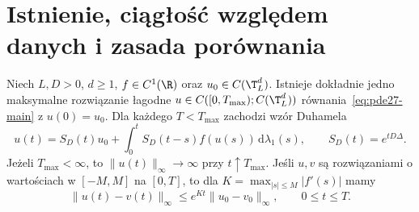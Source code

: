 \section{Istnienie, ciągłość względem danych i zasada porównania}
\begin{twierdzenie}\label{thm:pde27-local}
Niech $L,D>0$, $d\ge1$, $f\in C^1(\R)$ oraz
$u_0\in C(\T_L^d)$. Istnieje dokładnie jedno maksymalne
rozwiązanie łagodne $u\in C([0,T_{\max});C(\T_L^d))$
równania~\eqref{eq:pde27-main} z $u(0)=u_0$.
Dla każdego $T<T_{\max}$ zachodzi wzór Duhamela
\[
 u(t)=S_D(t)u_0+\int_0^tS_D(t-s)f(u(s))\,\mathrm d\lambda_1(s),
 \qquad S_D(t)=e^{tD\Delta}.
\]
Jeżeli $T_{\max}<\infty$, to
$\|u(t)\|_{\infty}\to\infty$ przy $t\uparrow T_{\max}$.
Jeśli $u,v$ są rozwiązaniami o wartościach w $[-M,M]$
na $[0,T]$, to dla $K=\max_{|s|\le M}|f'(s)|$ mamy
\[
 \|u(t)-v(t)\|_{\infty}\le e^{Kt}\|u_0-v_0\|_{\infty},
 \qquad 0\le t\le T.
\]
\end{twierdzenie}
